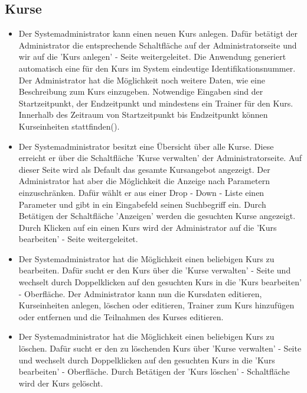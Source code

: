 \documentclass[a4paper]{scrreprt}
\begin{document}
\subsection{Kurse}
\begin{itemize}
	\item {}
	Der Systemadministrator kann einen neuen Kurs anlegen. Dafür betätigt der Administrator die entsprechende Schaltfläche auf der Administratorseite und wir auf die 'Kurs anlegen' - Seite weitergeleitet. Die Anwendung generiert automatisch eine für den Kurs im System eindeutige Identifikationsnummer. Der Administrator hat die Möglichkeit noch weitere Daten, wie eine Beschreibung zum Kurs einzugeben. Notwendige Eingaben sind der Startzeitpunkt, der Endzeitpunkt und mindestens ein Trainer für den Kurs. Innerhalb des Zeitraum von Startzeitpunkt bis Endzeitpunkt können Kurseinheiten stattfinden().
	\item {}
	Der Systemadministrator besitzt eine Übersicht über alle Kurse. Diese erreicht er über die Schaltfläche 'Kurse verwalten' der Administratorseite. Auf dieser Seite wird als Default das gesamte Kursangebot angezeigt. Der Administrator hat aber die Möglichkeit die Anzeige nach Parametern einzuschränken. Dafür wählt er aus einer Drop - Down - Liste einen Parameter und gibt in ein Eingabefeld seinen Suchbegriff ein. Durch Betätigen der Schaltfläche 'Anzeigen' werden die gesuchten Kurse angezeigt. Durch Klicken auf ein einen Kurs wird der Administrator auf die 'Kurs bearbeiten' - Seite weitergeleitet.
	\item {}
	Der Systemadministrator hat die Möglichkeit einen beliebigen Kurs zu bearbeiten. Dafür sucht er den Kurs über die 'Kurse verwalten' - Seite und wechselt durch Doppelklicken auf den gesuchten Kurs in die 'Kurs bearbeiten' - Oberfläche. Der Administrator kann nun die Kursdaten editieren, Kurseinheiten anlegen, löschen oder editieren, Trainer zum Kurs hinzufügen oder entfernen und die Teilnahmen des Kurses editieren.
	\item {}
	Der Systemadministrator hat die Möglichkeit einen beliebigen Kurs zu löschen. Dafür sucht er den zu löschenden Kurs über 'Kurse verwalten' - Seite und wechselt durch Doppelklicken auf den gesuchten Kurs in die 'Kurs bearbeiten' - Oberfläche. Durch Betätigen der 'Kurs löschen' - Schaltfläche wird der Kurs gelöscht.
\end{itemize}
\end{document}

